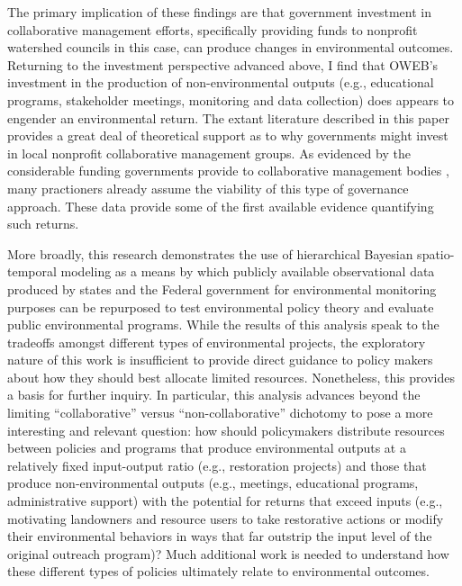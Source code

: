 \documentclass[11pt,a4paper,titlepage]{article}
\begin{document}
The primary implication of these findings are that government investment in collaborative management efforts, specifically providing funds to nonprofit watershed councils in this case, can produce changes in environmental outcomes. Returning to the investment perspective advanced above, I find that OWEB’s investment in the production of non-environmental outputs (e.g., educational programs, stakeholder meetings, monitoring and data collection) does appears to engender an environmental return. The extant literature described in this paper provides a great deal of theoretical support as to why governments might invest in local nonprofit collaborative management groups. As evidenced by the considerable funding governments provide to collaborative management bodies \parencite[e.g.,][]{sabatier2005}, many practioners already assume the viability of this type of governance approach. These data provide some of the first available evidence quantifying such returns. 

More broadly, this research demonstrates the use of hierarchical Bayesian spatio-temporal modeling as a means by which publicly available observational data produced by states and the Federal government for environmental monitoring purposes can be repurposed to test environmental policy theory and evaluate public environmental programs. While the results of this analysis speak to the tradeoffs amongst different types of environmental projects, the exploratory nature of this work is insufficient to provide direct guidance to policy makers about how they should best allocate limited resources. Nonetheless, this provides a basis for further inquiry. In particular, this analysis advances beyond the limiting ``collaborative'' versus ``non-collaborative'' dichotomy to pose a more interesting and relevant question: how should policymakers distribute resources between policies and programs that produce environmental outputs at a relatively fixed input-output ratio (e.g., restoration projects) and those that produce non-environmental outputs (e.g., meetings, educational programs, administrative support) with the potential for returns that exceed inputs (e.g., motivating landowners and resource users to take restorative actions or modify their environmental behaviors in ways that far outstrip the input level of the original outreach program)? Much additional work is needed to understand how these different types of policies ultimately relate to environmental outcomes. 

\printbibliography
\end{document}
